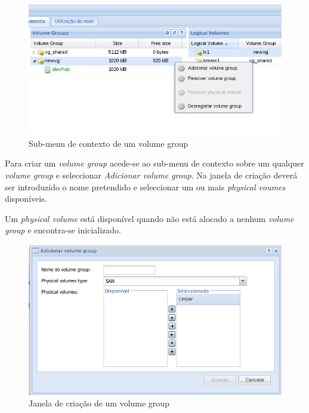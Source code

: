 \begin{figure}[H]
        \begin{center}
        \includegraphics[scale=0.45]{screenshots/node_storage_vg_ctx.png}
        \caption{Sub-menu de contexto de um volume group}
        \label{fig:storage_vg_ctx}
        \end{center}
\end{figure}

Para criar um \emph{volume group} acede-se ao sub-menu de contexto sobre um qualquer \emph{volume group} e seleccionar \emph{Adicionar volume group}.
Na janela de criação deverá ser introduzido o nome pretendido e seleccionar um ou mais \emph{physical voumes} disponíveis.

Um \emph{physical volume} está disponível quando não está alocado a nenhum \emph{volume group} e encontra-se inicializado.

\begin{figure}[H]
        \begin{center}
        \includegraphics[scale=0.5]{screenshots/storage_vg_create.png}
        \caption{Janela de criação de um volume group}
        \label{fig:storage_vg_create}
        \end{center}
\end{figure}

